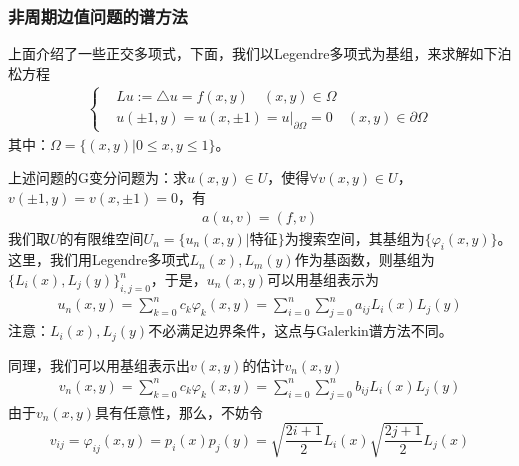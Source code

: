             \subsubsection{非周期边值问题的谱方法}
                \label{subsubsec:非周期边值问题的谱方法}
                \par
                上面介绍了一些正交多项式，下面，我们以Legendre多项式为基组，来求解如下泊松方程
                \begin{align*}
                    \left\{
                        \begin{aligned}
                        &Lu:=\triangle u = f(x,y)\quad (x,y)\in \Omega \\
                        &u(\pm 1, y) = u(x,\pm1) = u\bigl|_{\partial \Omega} = 0 \quad (x,y)\in \partial \Omega
                        \end{aligned}
                    \right.
                \end{align*}
                其中：$\Omega = \{(x,y)|0 \leqslant x,y \leqslant 1\}$。
                \par
                上述问题的G变分问题为：求$u(x,y) \in U$，使得$\forall v(x,y) \in U$，$v(\pm 1, y) = v(x,\pm1) = 0$，有
                \begin{align*}
                    a(u,v) = (f,v)
                \end{align*}
                我们取$U$的有限维空间$U_n = \{u_n(x,y)|\text {特征}\}$为搜索空间，其基组为$\{\varphi_i(x,y)\}$。这里，我们用Legendre多项式$L_n(x),L_m(y)$作为基函数，则基组为$\{L_i(x),L_j(y)\}_{i,j = 0}^n$，于是，$u_n(x,y)$可以用基组表示为
                \begin{align}
                    \label{u的基组形似}
                    u_n(x,y) = \sum_{k = 0}^n c_k \varphi_k(x,y) = \sum_{i = 0}^n\sum_{j = 0}^n a_{ij} L_i(x)L_j(y)
                \end{align}
                注意：$L_i(x),L_j(y)$不必满足边界条件，这点与Galerkin谱方法不同。
                \par
                同理，我们可以用基组表示出$v(x,y)$的估计$v_n(x,y)$
                \begin{align}
                    \label{v的基组形似}
                    v_n(x,y) = \sum_{k = 0}^n c_k \varphi_k(x,y) = \sum_{i = 0}^n\sum_{j = 0}^n b_{ij} L_i(x)L_j(y)
                \end{align}
                由于$v_n(x,y)$具有任意性，那么，不妨令
                \[
                v_{ij} = \varphi_{ij}(x,y) = p_i(x)p_j(y) = \sqrt{\frac{2i+1}{2}}L_i(x)\sqrt{\frac{2j+1}{2}}L_j(x)
                \]
